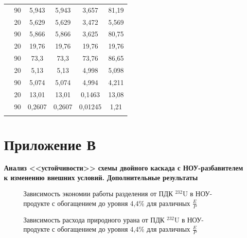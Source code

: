 \begin{table}[ht]
\begin{tabular}{|r|r||c|c|c|c|}
          & 90 & 5,943 & 5,943 & 3,657 & 81,19\\
      \Xhline{2\arrayrulewidth}
      \multirow{2}{*}{$C_{235,W_{2}}, \%$}
          & 20 & 5,629 & 5,629 & 3,472 & 5,569 \\\cline{2-6} 
          & 90 & 5,866 & 5,866 & 3,625 & 80,75\\
  \Xhline{2\arrayrulewidth}
      \multirow{2}{*}{$C_{235,P_{2}}, \%$}
          & 20 & 19,76 & 19,76 & 19,76 & 19,76 \\\cline{2-6} 
          & 90 & 73,3 & 73,3 & 73,76 & 86,65\\
      \Xhline{2\arrayrulewidth}
      \multirow{2}{*}{$C_{235,P_{n}}, \%$}
          & 20 & 5,13 & 5,13 & 4,998 & 5,098 \\\cline{2-6} 
          & 90 & 5,074 & 5,074 & 4,994 & 4,211\\
      \Xhline{2\arrayrulewidth}           
      \multirow{2}{*}{$P_2$, кг}
        & 20 & 13,01 & 13,01 & 0,1463 & 13,08 \\\cline{2-6} 
        & 90 & 0,2607 & 0,2607 & 0,01245 & 1,21\\
\Xhline{2\arrayrulewidth}
      \end{tabular}
\end{table}


\newpage

\chapter*{Приложение В}             %
\noindent

\renewcommand{\thefigure}{В\arabic{figure}}
\setcounter{figure}{0}
\renewcommand{\thetable}{В\arabic{table}}
\setcounter{table}{0}

\textbf{Анализ <<устойчивости>> схемы двойного каскада с НОУ-разбавителем к изменению внешних условий. Дополнительные результаты}

\begin{figure}
    \centering
    \begin{minipage}{.5\textwidth}
      \centering
      
      \caption{{Зависимость экономии работы разделения от ПДК $^{232}$U в НОУ-продукте с обогащением до уровня 4,4\% для различных $\frac{E}{P}${\label{sw44}}}}
    \end{minipage}%
    \begin{minipage}{.5\textwidth}
        \centering
        
  \caption{{Зависимость расхода природного урана от ПДК $^{232}$U в НОУ-продукте с обогащением до уровня 4,4\% для различных $\frac{E}{P}${\label{F0R44}}}}
      \end{minipage}
\end{figure}

